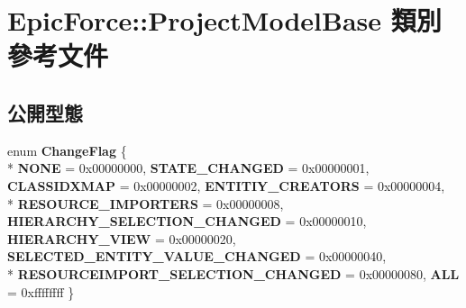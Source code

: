 \hypertarget{class_epic_force_1_1_project_model_base}{}\section{Epic\+Force\+:\+:Project\+Model\+Base 類別 參考文件}
\label{class_epic_force_1_1_project_model_base}
\subsection*{公開型態}
\begin{DoxyCompactItemize}
\item 
enum {\bfseries Change\+Flag} \{ \\*
{\bfseries N\+O\+NE} = 0x00000000, 
{\bfseries S\+T\+A\+T\+E\+\_\+\+C\+H\+A\+N\+G\+ED} = 0x00000001, 
{\bfseries C\+L\+A\+S\+S\+I\+D\+X\+M\+AP} = 0x00000002, 
{\bfseries E\+N\+T\+I\+T\+I\+Y\+\_\+\+C\+R\+E\+A\+T\+O\+RS} = 0x00000004, 
\\*
{\bfseries R\+E\+S\+O\+U\+R\+C\+E\+\_\+\+I\+M\+P\+O\+R\+T\+E\+RS} = 0x00000008, 
{\bfseries H\+I\+E\+R\+A\+R\+C\+H\+Y\+\_\+\+S\+E\+L\+E\+C\+T\+I\+O\+N\+\_\+\+C\+H\+A\+N\+G\+ED} = 0x00000010, 
{\bfseries H\+I\+E\+R\+A\+R\+C\+H\+Y\+\_\+\+V\+I\+EW} = 0x00000020, 
{\bfseries S\+E\+L\+E\+C\+T\+E\+D\+\_\+\+E\+N\+T\+I\+T\+Y\+\_\+\+V\+A\+L\+U\+E\+\_\+\+C\+H\+A\+N\+G\+ED} = 0x00000040, 
\\*
{\bfseries R\+E\+S\+O\+U\+R\+C\+E\+I\+M\+P\+O\+R\+T\+\_\+\+S\+E\+L\+E\+C\+T\+I\+O\+N\+\_\+\+C\+H\+A\+N\+G\+ED} = 0x00000080, 
{\bfseries A\+LL} = 0xffffffff
 \}\hypertarget{class_epic_force_1_1_project_model_base_a945664b7593cdcb0cfd72ae44e3d28a3}{}\label{class_epic_force_1_1_project_model_base_a945664b7593cdcb0cfd72ae44e3d28a3}

\end{DoxyCompactItemize}
